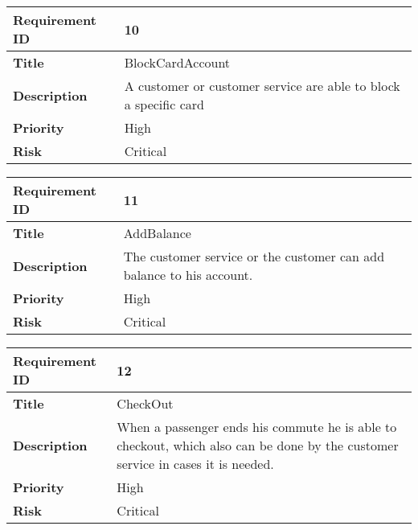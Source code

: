 \begin{center}
	\def\arraystretch{1.5}%
    \begin{tabular}{ | p{5cm} | p{5cm} |}
    \hline
    	\textbf{Requirement ID} & 10 \\ \hline
		\textbf{Title} & BlockCardAccount\\ \hline
		\textbf{Description} & A customer or customer service are able to block a specific card\\ \hline
		\textbf{Priority} & High\\ \hline
		\textbf{Risk} & Critical\\
      \hline
    \end{tabular}
\end{center}

\begin{center}
	\def\arraystretch{1.5}%
    \begin{tabular}{ | p{5cm} | p{5cm} |}
    \hline
    	\textbf{Requirement ID} & 11 \\ \hline
		\textbf{Title} & AddBalance\\ \hline
		\textbf{Description} & The customer service or the customer can add balance to his account.\\ \hline
		\textbf{Priority} & High\\ \hline
		\textbf{Risk} & Critical\\
      \hline
    \end{tabular}
\end{center}

\begin{center}
	\def\arraystretch{1.5}%
    \begin{tabular}{ | p{5cm} | p{5cm} |}
    \hline
    	\textbf{Requirement ID} & 12 \\ \hline
		\textbf{Title} & CheckOut\\ \hline
		\textbf{Description} & When a passenger ends his commute he is able to checkout, which also can be done by the customer service in cases it is needed.\\ \hline
		\textbf{Priority} & High\\ \hline
		\textbf{Risk} & Critical\\
      \hline
    \end{tabular}
\end{center}

